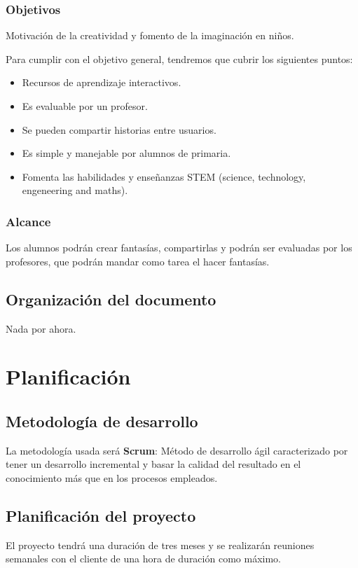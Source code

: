 \documentclass[12pt,letterpaper]{article}
\begin{document}
\subsubsection{Objetivos}
Motivación de la creatividad y fomento de la imaginación en niños.

Para cumplir con el objetivo general, tendremos que cubrir los siguientes puntos:
\begin{itemize}
	\item Recursos de aprendizaje interactivos.
	\item Es evaluable por un profesor.
	\item Se pueden compartir historias entre usuarios.
	\item Es simple y manejable por alumnos de primaria.
	\item Fomenta las habilidades y enseñanzas STEM (science, technology, engeneering and maths).
\end{itemize}

\subsubsection{Alcance}
Los alumnos podrán crear fantasías, compartirlas y podrán ser evaluadas por los profesores, que podrán mandar como tarea el hacer fantasías.

\subsection{Organización del documento}
Nada por ahora.

\newpage
\section{Planificación}
\subsection{Metodología de desarrollo}
La metodología usada será \textbf{Scrum}: Método de desarrollo ágil caracterizado por tener un desarrollo incremental y basar la calidad del resultado en el conocimiento más que en los procesos empleados.

\subsection{Planificación del proyecto}
El proyecto tendrá una duración de tres meses y se realizarán reuniones semanales con el cliente de una hora de duración como máximo.

\end{document}
